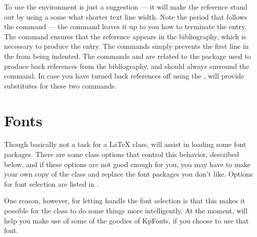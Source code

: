 To use the  environment is just a suggestion — it will make the reference stand out by using a some what shorter text line width.  Note the period that follows the  command — the command leaves it up to you how to terminate the entry.  The  command ensures that the reference appears in the bibliography, which is necessary to produce the entry.  The  commands simply prevents the first line in the  from being indented.  The commands  and  are related to the  package used to produce back references from the bibliography, and should always surround the  command.  In case you have turned back references off using the , \rtthesis will provide substitutes for these two commands.


\section{Fonts}
%
Though basically not a task for a \LaTeX{} class, \rtthesis will assist in loading some font packages.  There are some class options that control this behavior, described below, and if these options are not good enough for you, you may have to make your own copy of the class and replace the font packages you don't like.  Options for font selection are listed in .

One reason, however, for letting \rtthesis handle the font selection is that this makes it possible for the class to do some things more intelligently.  At the moment, \rtthesis will help you make use of some of the goodies of KpFonts, if you choose to use that font.


